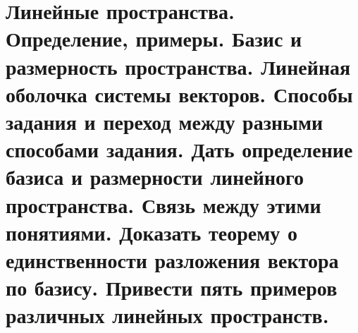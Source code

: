 \section{
    Линейные пространства. Определение, примеры. Базис и размерность пространства. Линейная оболочка системы векторов. Способы задания и переход между разными способами задания. Дать определение базиса и размерности линейного пространства. Связь между этими понятиями. Доказать теорему о единственности разложения вектора по базису. Привести пять примеров различных линейных пространств.
}




\newpage





\newpage





\newpage





\newpage



